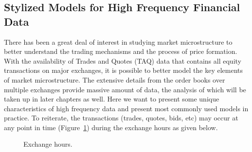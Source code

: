 \subsection{Stylized Models for High Frequency Financial Data}

There has been a great deal of interest in studying market microstructure to better understand the trading mechanisms and the process of price formation. With the availability of Trades and Quotes (TAQ) data that contains all equity transactions on major exchanges, it is possible to better model the key elements of market microstructure. The extensive details from the order books over multiple exchanges provide massive amount of data, the analysis of which will be taken up in later chapters as well. Here we want to present some unique characteristics of high frequency data and present most commonly used models in practice. To reiterate, the transactions (trades, quotes, bids, etc) may occur at any point in time (Figure~\ref{fig:exchhours}) during the exchange hours as given below.

	\begin{figure}[!ht]
	\centering
	\caption{Exchange hours.\label{fig:exchhours}}
	\end{figure}

